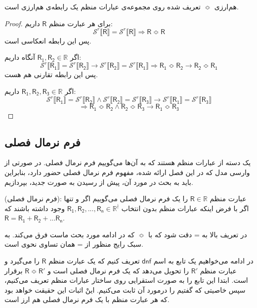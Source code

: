 \begin{thm}
	هم‌ارزی $\Bumpeq$ تعریف شده روی مجموعه‌ی عبارات منظم یک رابطه‌ی هم‌ارزی است.
\end{thm}
\begin{proof}
	برای هر عبارت منظم $\mathsf{R}$ داریم:
	$$\mathcal{S}^r \llbracket \mathsf{R} \rrbracket = 
	\mathcal{S}^r \llbracket \mathsf{R} \rrbracket \Rightarrow
	\mathsf{R} \Bumpeq \mathsf{R}$$
	پس این رابطه انعکاسی است.
	
	اگر 
	$\mathsf{R_1 , R_2} \in \mathbb{R}$
	آنگاه داریم:
	$$\mathcal{S}^r \llbracket \mathsf{R_1} \rrbracket =
	\mathcal{S}^r \llbracket \mathsf{R_2} \rrbracket \rightarrow
	\mathcal{S}^r \llbracket \mathsf{R_2} \rrbracket =
	\mathcal{S}^r \llbracket \mathsf{R_1} \rrbracket \Rightarrow
	\mathsf{R_1} \Bumpeq \mathsf{R_2} \rightarrow
	\mathsf{R_2} \Bumpeq \mathsf{R_1}$$
	پس این رابطه تقارنی هم هست.
	
	اگر
	 $\mathsf{R_1,R_2,R_3} \in \mathbb{R}$
	 	داریم:
	 $$\mathcal{S}^r \llbracket \mathsf{R_1} \rrbracket =
	 \mathcal{S}^r \llbracket \mathsf{R_2} \rrbracket \land
	 \mathcal{S}^r \llbracket \mathsf{R_2} \rrbracket =
	 \mathcal{S}^r \llbracket \mathsf{R_3} \rrbracket \rightarrow
	 \mathcal{S}^r \llbracket \mathsf{R_1} \rrbracket =
	 \mathcal{S}^r \llbracket \mathsf{R_3} \rrbracket$$
	 $$\Rightarrow
	 \mathsf{R_1} \Bumpeq \mathsf{R_2} \land
	 \mathsf{R_2} \Bumpeq \mathsf{R_3} \rightarrow
	 \mathsf{R_1} \Bumpeq \mathsf{R_3}$$
\end{proof}


\subsection{فرم نرمال فصلی}
	 یک دسته از عبارات منظم هستند که به آن‌ها می‌گوییم فرم نرمال فصلی. در صورتی از وارسی مدل که در این فصل ارائه شده، مفهوم فرم نرمال فصلی حضور دارد، بنابراین باید به بحث در مورد آن، پیش از رسیدن به صورت جدید، بپردازیم.
	 \begin{defn}
	 	(فرم نرمال فصلی): عبارت منظم 
	 	$\mathsf{R} \in \mathbb{R}$
	 	را یک فرم نرمال فصلی می‌گوییم اگر و تنها اگر با فرض اینکه عبارات منظم بدون انتخاب
	 	$\mathsf{R_1 , R_2, ..., R_n} \in \mathbb{R}^{\nmid}$
	 	وجود داشته باشند که 
	 	$\mathsf{R= R_1 + R_2 + ... R_n}$.
	 \end{defn}
 در تعریف بالا به = دقت شود که با 
 $\Bumpeq$
 که در ادامه مورد بحث ماست فرق می‌کند. به سبک رایج منظور از = همان تساوی نحوی است.
 
 در ادامه می‌خواهیم یک تابع به اسم $\mathsf{dnf}$ تعریف کنیم که یک عبارت منظم $\mathsf{R}$ را می‌گیرد و عبارت منظم $\mathsf{R'}$ را تحویل می‌دهد که یک فرم نرمال فصلی است و 
 $\mathsf{R \Bumpeq R'}$
برقرار است. ابتدا این تابع را به صورت استقرایی روی ساختار عبارات منظم تعریف می‌کنیم، سپس خاصیتی که گفتیم را درمورد آن ثابت می‌کنیم. اینْ اثبات این حقیقت خواهد بود که هر عبارت منظم با یک فرم نرمال فصلی هم ارز است.
  
